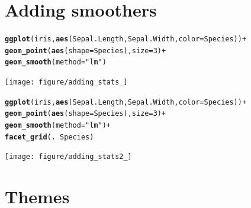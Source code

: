 \documentclass{beamer}\usepackage{graphicx, color}
\makeatletter
\newcommand{\hlfunctioncall}[1]{\textcolor[rgb]{0.501960784313725,0,0.329411764705882}{\textbf{#1}}}%
\newcommand{\hlstring}[1]{\textcolor[rgb]{0.6,0.6,1}{#1}}%
\newenvironment{kframe}{%
 \def\at@end@of@kframe{}%
 \ifinner\ifhmode%
  \def\at@end@of@kframe{\end{minipage}}%
  \begin{minipage}{\columnwidth}%
 \fi\fi%
 \def\FrameCommand##1{\hskip\@totalleftmargin \hskip-\fboxsep
 \colorbox{shadecolor}{##1}\hskip-\fboxsep
     \hskip-\linewidth \hskip-\@totalleftmargin \hskip\columnwidth}%
 \MakeFramed {\advance\hsize-\width
   \@totalleftmargin\z@ \linewidth\hsize
   \@setminipage}}%
 {\par\unskip\endMakeFramed%
 \at@end@of@kframe}
\newenvironment{knitrout}{}{} %
\makeatother
\begin{document}
\section*{Adding smoothers}
\frame{\sectionpage}


\begin{frame}[fragile]
\begin{knitrout}\footnotesize
{}\color{fgcolor}\begin{kframe}
\begin{alltt}
\hlfunctioncall{ggplot}(iris, \hlfunctioncall{aes}(Sepal.Length, Sepal.Width, color = Species)) +
\hlfunctioncall{geom_point}(\hlfunctioncall{aes}(shape = Species), size = 3) +
\hlfunctioncall{geom_smooth}(method = \hlstring{"lm"})
\end{alltt}
\end{kframe}
\texttt{[image: figure/adding\_stats\_]} 

\end{knitrout}

\end{frame}

\begin{frame}[fragile]
\begin{knitrout}\footnotesize
{}\color{fgcolor}\begin{kframe}
\begin{alltt}
\hlfunctioncall{ggplot}(iris, \hlfunctioncall{aes}(Sepal.Length, Sepal.Width, color = Species)) +
\hlfunctioncall{geom_point}(\hlfunctioncall{aes}(shape = Species), size = 3) +
\hlfunctioncall{geom_smooth}(method = \hlstring{"lm"}) +
\hlfunctioncall{facet_grid}(. ~ Species)
\end{alltt}
\end{kframe}
\texttt{[image: figure/adding\_stats2\_]} 

\end{knitrout}

\end{frame}

\section*{Themes}
\frame{\sectionpage}
\end{document}
